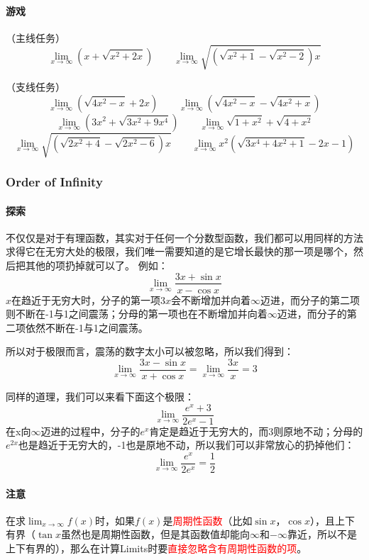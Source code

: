 \documentclass[UTF8]{ctexart}
\begin{document}
\paragraph{游戏}

（主线任务）
\[  {\lim_{x \to \infty} (x + \sqrt{x^2+2x})}\qquad {\lim_{x \to \infty} \sqrt{(\sqrt{x^2+1}-\sqrt{x^2-2})x}}\]

（支线任务）
\[{\lim_{x \to \infty} (\sqrt{4x^2-x} + 2x)}  \qquad  {\lim_{x \to \infty} (\sqrt{4x^2-x} - \sqrt{4x^2 + x})} \]
\[{\lim_{x \to \infty} (3x^2 + \sqrt{ 3x^2 + 9x^4})}  \qquad  {\lim_{x \to \infty} \sqrt{1+ x^2} +\sqrt{4+x^2}}\]
\[{\lim_{x \to \infty} \sqrt{(\sqrt{2x^2+4}-\sqrt{2x^2-6})x}}  \qquad  {\lim_{x \to \infty} x^2(\sqrt{3x^4+4x^2+1} - 2x - 1)}\]



\subsubsection{Order of Infinity}
\paragraph{探索}
不仅仅是对于有理函数，其实对于任何一个分数型函数，我们都可以用同样的方法求得它在无穷大处的极限，我们唯一需要知道的是它增长最快的那一项是哪个，然后把其他的项扔掉就可以了。
例如：
\[{\lim_{x \to \infty} \frac{3x + \sin{x}}{x- \cos{x}}}\]
$x$在趋近于无穷大时，分子的第一项$3x$会不断增加并向着$\infty$迈进，而分子的第二项则不断在-1与1之间震荡；分母的第一项也在不断增加并向着$\infty$迈进，而分子的第二项依然不断在-1与1之间震荡。

所以对于极限而言，震荡的数字太小可以被忽略，所以我们得到：
\[{\lim_{x \to \infty} \frac{3x - \sin{x}}{x+ \cos{x}}} = {\lim_{x \to \infty} \frac{3x}{x}} = 3\]

同样的道理，我们可以来看下面这个极限：
\[{\lim_{x \to \infty} \frac{e^x + 3}{2e^x-1}}\]
在x向$\infty$迈进的过程中，分子的$e^x$肯定是趋近于无穷大的，而3则原地不动；分母的$e^{2x}$也是趋近于无穷大的，-1也是原地不动，所以我们可以非常放心的扔掉他们：
\[{\lim_{x\to\infty}\frac{e^x}{2e^x}}  = \frac{1}{2}\]

\paragraph{注意}
在求${\lim_{x \to \infty} f(x)}$时，如果$f(x)$是\textcolor{red}{周期性函数}（比如$\sin{x}$，$\cos{x}$），且上下有界（$\tan{x}$虽然也是周期性函数，但是其函数值却能向$\infty$和$-\infty$靠近，所以不是上下有界的），那么在计算Limits时要\textcolor{red}{直接忽略含有周期性函数的项}。
\end{document}
